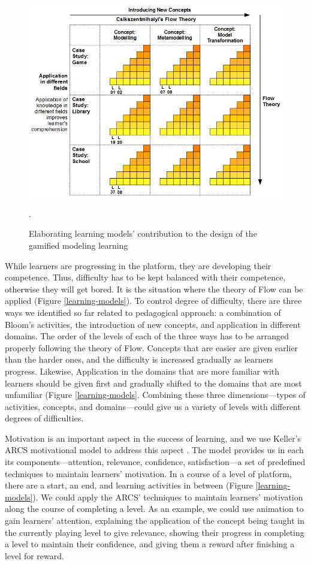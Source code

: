 \documentclass[12pt, a4paper]{report} \usepackage[titletoc]{appendix}
\begin{document}
\begin{appendices}
\begin{figure}[ht]
\centering
\includegraphics[width=\textwidth]{learning-models2}
\caption{Elaborating learning models' contribution to the design of the gamified modeling learning}.
\label{learning-models2}
\end{figure}

While learners are progressing in the platform, they are developing their competence. Thus, difficulty has to be kept balanced with their competence, otherwise they will get bored. It is the situation where the theory of Flow can be applied (Figure \ref{learning-models}). To control degree of difficulty, there are three ways we identified so far related to pedagogical approach: a combination of Bloom's activities, the introduction of new concepts, and application in different domains. The order of the levels of each of the three ways has to be arranged properly following the theory of Flow. Concepts that are easier are given earlier than the harder ones, and the difficulty is increased gradually as learners progress. Likewise, Application in the domains that are more familiar with learners should be given first and gradually shifted to the domains that are most unfamiliar (Figure \ref{learning-models}. Combining these three dimensions---types of activities, concepts, and domains---could give us a variety of levels with different degrees of difficulties.

Motivation is an important aspect in the success of learning, and we use Keller's ARCS motivational model to address this aspect \cite{keller2010motivational}. The model provides us in each its components---attention, relevance, confidence, satisfaction---a set of predefined techniques to maintain learners' motivation. In a course of a level of platform, there are a start, an end, and learning activities in between (Figure \ref{learning-models}). We could apply the ARCS' techniques to maintain learners' motivation along the course of completing a level. As an example, we could use animation to gain learners' attention, explaining the application of the concept being taught in the currently playing level to give relevance, showing their progress in completing a level to maintain their confidence, and giving them a reward after finishing a level for reward.
 

\end{appendices}
\end{document}
